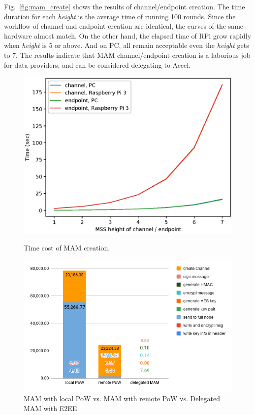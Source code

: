 \documentclass[10pt, conference, compsocconf]{IEEEtran}
\begin{document}
Fig.~\ref{fig:mam_create} shows the results of channel/endpoint creation. The time duration for each \textit{height} is the average time of running 100 rounds. Since the workflow of channel and endpoint creation are identical, the curves of the same hardware almost match. On the other hand, the elapsed time of RPi grow rapidly when \textit{height} is 5 or above. And on PC, all remain acceptable even the \textit{height} gets to 7. The results indicate that MAM channel/endpoint creation is a laborious job for data providers, and can be considered delegating to Accel.
\begin{figure}[!htb]
  \includegraphics[width=\linewidth]{mam_create}
  \caption{Time cost of MAM creation.}\label{fig:mam_create}
\endminipage\hfill
{}
  \includegraphics[width=\linewidth]{rpi3_pow}
  \caption{MAM with local PoW \newline vs. MAM with remote PoW \newline vs. Delegated MAM with E2EE}\label{fig:rpi3_pow}  

\end{figure}
\end{document}
